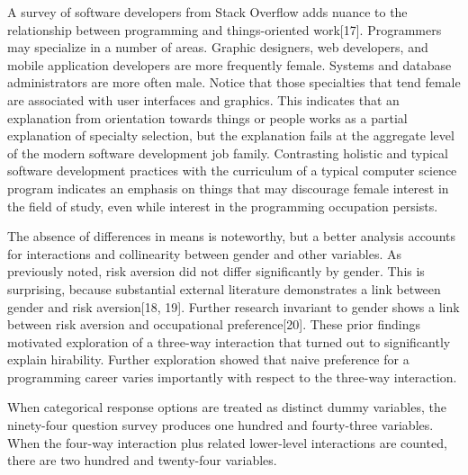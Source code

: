 \documentclass[review]{elsarticle}
\begin{document}
A survey of software developers from Stack Overflow adds nuance to the relationship between programming and things-oriented work[17].
Programmers may specialize in a number of areas.
Graphic designers, web developers, and mobile application developers are more frequently female.
Systems and database administrators are more often male.
Notice that those specialties that tend female are associated with user interfaces and graphics.
This indicates that an explanation from orientation towards things or people works as a partial explanation of specialty selection,
but the explanation fails at the aggregate level of the modern software development job family.
Contrasting holistic and typical software development practices with the curriculum of a typical computer science program
indicates an emphasis on things that may discourage female interest in the field of study,
even while interest in the programming occupation persists.

The absence of differences in means is noteworthy,
but a better analysis accounts for interactions and collinearity between gender and other variables.
As previously noted, risk aversion did not differ significantly by gender.
This is surprising, because substantial external literature demonstrates a link between gender and risk aversion[18, 19].
Further research invariant to gender shows a link between risk aversion and occupational preference[20].
These prior findings motivated exploration of a three-way interaction that turned out to significantly explain hirability.
Further exploration showed that naive preference for a programming career varies importantly with respect to the three-way interaction.


When categorical response options are treated as distinct dummy variables,
the ninety-four question survey produces one hundred and fourty-three variables.
When the four-way interaction plus related lower-level interactions are counted,
there are two hundred and twenty-four variables.
\end{document}
